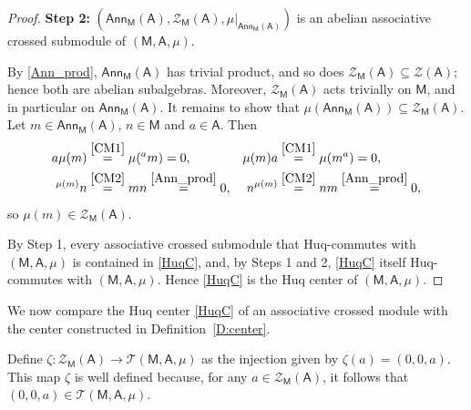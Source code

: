 \documentclass[12pt,reqno]{amsart}
\theoremstyle{plain}
\theoremstyle{definition}
\theoremstyle{remark}
\newcommand{\A}{\ensuremath{\mathsf{A}}}
\newcommand{\MM}{\ensuremath{\mathsf{M}}}
\newcommand{\ZZ}{\ensuremath{\mathscr{Z}}}
\newcommand{\T}{\ensuremath{\mathcal{T}}}
\newcommand{\Ann}{\ensuremath{\mathsf{Ann}}}
\numberwithin{equation}{section}
\begin{document}
\begin{proof}
	\textbf{Step 2:} $(\Ann_{\MM}(\A),\ZZ_{\MM}(\A),\mu|_{\Ann_{\MM}(\A)})$ is an abelian associative crossed submodule of $(\MM,\A,\mu)$.
	
	By \eqref{Ann_prod}, $\Ann_{\MM}(\A)$ has trivial product, and so does $\ZZ_{\MM}(\A)\subseteq\ZZ(\A)$; hence both are abelian subalgebras. Moreover, $\ZZ_{\MM}(\A)$ acts trivially on $\MM$, and in particular on $\Ann_{\MM}(\A)$. It remains to show that $\mu(\Ann_{\MM}(\A))\subseteq\ZZ_{\MM}(\A)$. Let $m\in\Ann_{\MM}(\A)$, $n\in\MM$ and $a\in\A$. Then
	\begin{align*}
		a\mu(m)&\stackrel{\eqref{CM1}}{=}\mu({}^{a}m)=0, & \mu(m)a&\stackrel{\eqref{CM1}}{=}\mu(m^{a})=0,\\
		{}^{\mu(m)}n&\stackrel{\eqref{CM2}}{=}mn\stackrel{\eqref{Ann_prod}}{=}0, & n^{\mu(m)}&\stackrel{\eqref{CM2}}{=}nm\stackrel{\eqref{Ann_prod}}{=}0,
	\end{align*}
	so $\mu(m)\in\ZZ_{\MM}(\A)$.
	
	By Step 1, every associative crossed submodule that Huq-commutes with $(\MM,\A,\mu)$ is contained in \eqref{HuqC}, and, by Steps 1 and 2,
	 \eqref{HuqC} itself Huq-commutes with $(\MM,\A,\mu)$. Hence \eqref{HuqC} is the Huq center of $(\MM,\A,\mu)$.
\end{proof}

We now compare the Huq center \eqref{HuqC} of an associative crossed module with the center constructed in Definition~\ref{D:center}.

Define $\zeta  \colon \ZZ_{\MM}(\A) \to  \T(\MM,\A,\mu)$ as the injection given by $\zeta(a)=(0,0,a)$.  This map $\zeta$ is  well defined because,
 for any $a \in \ZZ_{\MM}(\A)$, it follows that $(0,0,a)\in\T(\MM,\A,\mu)$.
\end{document}
